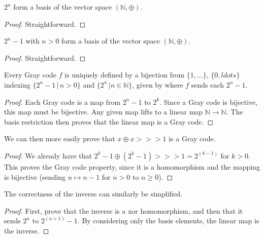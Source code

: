 \begin{lemma}
    \label{thm:two_pow_xor_basis}
    $2^n$ form a basis of the vector space $(\mathbb{N}, \oplus)$.
\end{lemma}

\begin{proof}
    Straightforward.
\end{proof}

\begin{lemma}
    \label{thm:two_pow_sub_one_xor_basis}
    $2^n - 1$ with $n > 0$ form a basis of the vector space $(\mathbb{N}, \oplus)$.
\end{lemma}

\begin{proof}
    Straightforward.
\end{proof}

\begin{lemma}
    \label{thm:bijective_gray_code_characterization}
    Every Gray code $f$ is uniquely defined by a bijection from $\{1,\ldots\}$, $\{0,ldots\}$
    indexing $\{2^n - 1 \, | \, n > 0\}$ and $\{2^n \, | n \in \mathbb{N} \}$, given
    by where $f$ sends each $2^n - 1$.
\end{lemma}

\begin{proof}
    Each Gray code is a map from $2^n - 1$ to $2^k$. Since a Gray code is bijective,
    this map must be bijective. Any given map lifts to a linear map $\mathbb{N} \to \mathbb{N}$.
    The basis restriction then proves that the linear map is a Gray code.
\end{proof}

\begin{theorem}
    \label{thm:linear_algebra_direct_proof}
    We can then more easily prove that $x \oplus x >>> 1$ is a Gray code.
\end{theorem}

\begin{proof}
    We already have that $2^k - 1 \oplus (2^k - 1) >>> 1 = 2^(k-1)$ for $k > 0$. This
    proves the Gray code property, since it is a homomorphism and the mapping is bijective
    (sending $n \mapsto n - 1$ for $n > 0$ to $n \geq 0$).
\end{proof}

\begin{theorem}
    \label{thm:alternate_inverse_proof}
    The correctness of the inverse can similarly be simplified.
\end{theorem}

\begin{proof}
    First, prove that the inverse is a xor homomorphism, and then that it sends $2^n$ to $2^(n+1) - 1$.
    By considering only the basis elements, the linear map is the inverse.
\end{proof}
